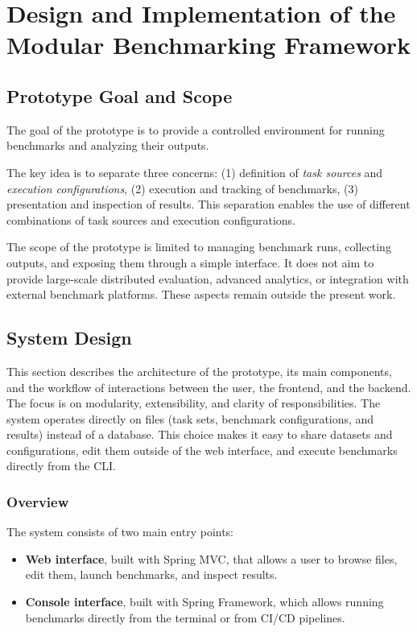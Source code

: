 \chapter{Design and Implementation of the Modular Benchmarking Framework}

\section{Prototype Goal and Scope}

The goal of the prototype is to provide a controlled environment for running benchmarks and analyzing their outputs.

The key idea is to separate three concerns:
(1) definition of \textit{task sources} and \textit{execution configurations},
(2) execution and tracking of benchmarks,
(3) presentation and inspection of results.
This separation enables the use of different combinations of task sources and execution configurations.

The scope of the prototype is limited to managing benchmark runs, collecting outputs, and exposing them through a simple interface.
It does not aim to provide large-scale distributed evaluation, advanced analytics, or integration with external benchmark platforms.
These aspects remain outside the present work.




\section{System Design}

This section describes the architecture of the prototype, its main components, and the workflow of interactions between the user, the frontend, and the backend.
The focus is on modularity, extensibility, and clarity of responsibilities.
The system operates directly on files (task sets, benchmark configurations, and results) instead of a database.
This choice makes it easy to share datasets and configurations, edit them outside of the web interface, and execute benchmarks directly from the CLI.

\subsection{Overview}

The system consists of two main entry points:
\begin{itemize}
    \item \textbf{Web interface}, built with Spring MVC, that allows a user to browse files, edit them, launch benchmarks, and inspect results.
    \item \textbf{Console interface}, built with Spring Framework, which allows running benchmarks directly from the terminal or from CI/CD pipelines.
\end{itemize}

